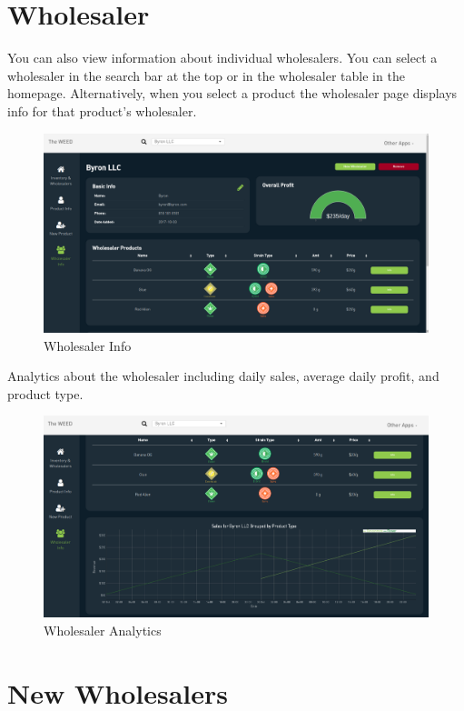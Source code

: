 \documentclass[]{book}
\theoremstyle{definition}
\theoremstyle{definition}
\theoremstyle{definition}
\theoremstyle{remark}
\begin{document}
\section{Wholesaler}\label{wholesaler}

You can also view information about individual wholesalers. You can
select a wholesaler in the search bar at the top or in the wholesaler
table in the homepage. Alternatively, when you select a product the
wholesaler page displays info for that product's wholesaler.

\begin{figure}
\centering
\includegraphics{images/wholesaler.png}
\caption{Wholesaler Info}
\end{figure}

Analytics about the wholesaler including daily sales, average daily
profit, and product type.

\begin{figure}
\centering
\includegraphics{images/wholesaler2.png}
\caption{Wholesaler Analytics}
\end{figure}

\section{New Wholesalers}\label{new-wholesalers}
\end{document}
